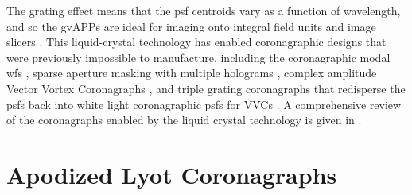 \documentclass[letterpaper]{ar-1col}
\begin{document}
%
The grating effect means that the \ac{psf} centroids vary as a function of wavelength, and so the gvAPPs are ideal for imaging onto integral field units and image slicers \citep{Sutlieff21,Sutlieff23}.
%
This liquid-crystal technology has enabled coronagraphic designs that were previously impossible to manufacture, including the coronagraphic modal \ac{wfs} \citep{Wilby17}, sparse aperture masking with multiple holograms \citep{Doelman21}, complex amplitude Vector Vortex Coronagraphs \citep[VVC; ][]{Snik14}, and triple grating coronagraphs \citep{Doelman20} that redisperse the \acp{psf} back into white light coronagraphic \acp{psf} for VVCs \citep{Doelman23,Laginga24}. 
%
A comprehensive review of the coronagraphs enabled by the liquid crystal technology is given in \citet{Doelman2021a}.

\section{Apodized Lyot Coronagraphs}\label{sec:nulled_lyot}
\end{document}
